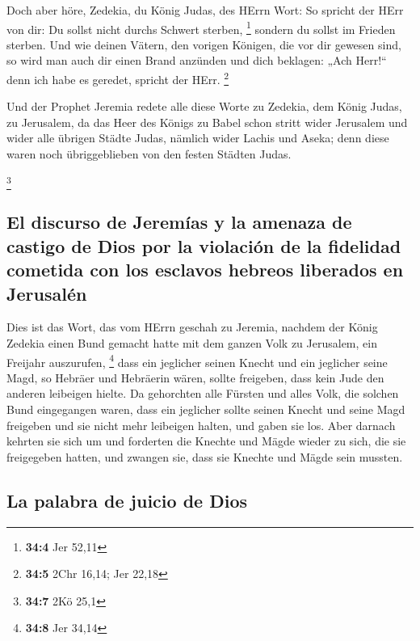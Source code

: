  Doch aber höre, Zedekia, du König Judas, des HErrn Wort:
So spricht der HErr von dir: Du sollst nicht durchs Schwert sterben,
\footnote{\textbf{34:4} Jer 52,11}  sondern du sollst im
Frieden sterben. Und wie deinen Vätern, den vorigen Königen, die vor dir
gewesen sind, so wird man auch dir einen Brand anzünden und dich
beklagen: „Ach Herr!{}`` denn ich habe es geredet, spricht der HErr.
\footnote{\textbf{34:5} 2Chr 16,14; Jer 22,18}

 Und der Prophet Jeremia redete alle diese Worte zu
Zedekia, dem König Judas, zu Jerusalem,  da das Heer des
Königs zu Babel schon stritt wider Jerusalem und wider alle übrigen
Städte Judas, nämlich wider Lachis und Aseka; denn diese waren noch
übriggeblieben von den festen Städten Judas.

\footnote{\textbf{34:7} 2Kö 25,1}

\hypertarget{el-discurso-de-jeremuxedas-y-la-amenaza-de-castigo-de-dios-por-la-violaciuxf3n-de-la-fidelidad-cometida-con-los-esclavos-hebreos-liberados-en-jerusaluxe9n}{%
\subsection{El discurso de Jeremías y la amenaza de castigo de Dios por
la violación de la fidelidad cometida con los esclavos hebreos liberados
en
Jerusalén}\label{el-discurso-de-jeremuxedas-y-la-amenaza-de-castigo-de-dios-por-la-violaciuxf3n-de-la-fidelidad-cometida-con-los-esclavos-hebreos-liberados-en-jerusaluxe9n}}

 Dies ist das Wort, das vom HErrn geschah zu Jeremia,
nachdem der König Zedekia einen Bund gemacht hatte mit dem ganzen Volk
zu Jerusalem, ein Freijahr auszurufen, \footnote{\textbf{34:8} Jer 34,14}
 dass ein jeglicher seinen Knecht und ein jeglicher seine
Magd, so Hebräer und Hebräerin wären, sollte freigeben, dass kein Jude
den anderen leibeigen hielte.  Da gehorchten alle Fürsten
und alles Volk, die solchen Bund eingegangen waren, dass ein jeglicher
sollte seinen Knecht und seine Magd freigeben und sie nicht mehr
leibeigen halten, und gaben sie los.  Aber darnach
kehrten sie sich um und forderten die Knechte und Mägde wieder zu sich,
die sie freigegeben hatten, und zwangen sie, dass sie Knechte und Mägde
sein mussten.

\hypertarget{la-palabra-de-juicio-de-dios}{%
\subsection{La palabra de juicio de
Dios}\label{la-palabra-de-juicio-de-dios}}

